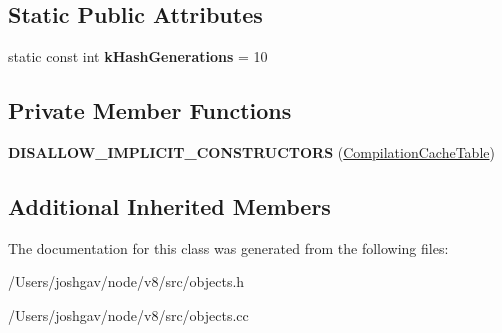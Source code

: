 \subsection*{Static Public Attributes}
\begin{DoxyCompactItemize}
\item 
static const int {\bfseries k\+Hash\+Generations} = 10\hypertarget{classv8_1_1internal_1_1_compilation_cache_table_adb7672181225869e9b8ca7d196e9f574}{}\label{classv8_1_1internal_1_1_compilation_cache_table_adb7672181225869e9b8ca7d196e9f574}

\end{DoxyCompactItemize}
\subsection*{Private Member Functions}
\begin{DoxyCompactItemize}
\item 
{\bfseries D\+I\+S\+A\+L\+L\+O\+W\+\_\+\+I\+M\+P\+L\+I\+C\+I\+T\+\_\+\+C\+O\+N\+S\+T\+R\+U\+C\+T\+O\+RS} (\hyperlink{classv8_1_1internal_1_1_compilation_cache_table}{Compilation\+Cache\+Table})\hypertarget{classv8_1_1internal_1_1_compilation_cache_table_a3be00d9406b9e3c5ddb420620d6689da}{}\label{classv8_1_1internal_1_1_compilation_cache_table_a3be00d9406b9e3c5ddb420620d6689da}

\end{DoxyCompactItemize}
\subsection*{Additional Inherited Members}


The documentation for this class was generated from the following files\+:\begin{DoxyCompactItemize}
\item 
/\+Users/joshgav/node/v8/src/objects.\+h\item 
/\+Users/joshgav/node/v8/src/objects.\+cc\end{DoxyCompactItemize}
